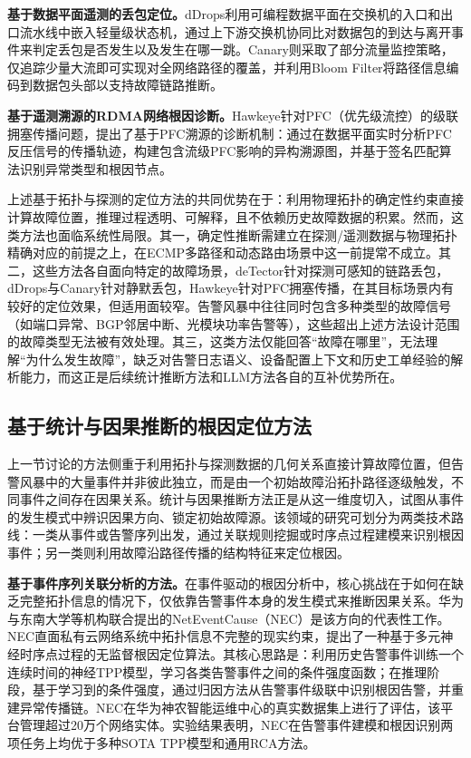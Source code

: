 \textbf{基于数据平面遥测的丢包定位。}dDrops利用可编程数据平面在交换机的入口和出口流水线中嵌入轻量级状态机，通过上下游交换机协同比对数据包的到达与离开事件来判定丢包是否发生以及发生在哪一跳。Canary则采取了部分流量监控策略，仅追踪少量大流即可实现对全网络路径的覆盖，并利用Bloom Filter将路径信息编码到数据包头部以支持故障链路推断。

\textbf{基于遥测溯源的RDMA网络根因诊断。}Hawkeye针对PFC（优先级流控）的级联拥塞传播问题，提出了基于PFC溯源的诊断机制：通过在数据平面实时分析PFC反压信号的传播轨迹，构建包含流级PFC影响的异构溯源图，并基于签名匹配算法识别异常类型和根因节点。

上述基于拓扑与探测的定位方法的共同优势在于：利用物理拓扑的确定性约束直接计算故障位置，推理过程透明、可解释，且不依赖历史故障数据的积累。然而，这类方法也面临系统性局限。其一，确定性推断需建立在探测/遥测数据与物理拓扑精确对应的前提之上，在ECMP多路径和动态路由场景中这一前提常不成立。其二，这些方法各自面向特定的故障场景，deTector针对探测可感知的链路丢包，dDrops与Canary针对静默丢包，Hawkeye针对PFC拥塞传播，在其目标场景内有较好的定位效果，但适用面较窄。告警风暴中往往同时包含多种类型的故障信号（如端口异常、BGP邻居中断、光模块功率告警等），这些超出上述方法设计范围的故障类型无法被有效处理。其三，这类方法仅能回答“故障在哪里”，无法理解“为什么发生故障”，缺乏对告警日志语义、设备配置上下文和历史工单经验的解析能力，而这正是后续统计推断方法和LLM方法各自的互补优势所在。

\subsection{基于统计与因果推断的根因定位方法}

上一节讨论的方法侧重于利用拓扑与探测数据的几何关系直接计算故障位置，但告警风暴中的大量事件并非彼此独立，而是由一个初始故障沿拓扑路径逐级触发，不同事件之间存在因果关系。统计与因果推断方法正是从这一维度切入，试图从事件的发生模式中辨识因果方向、锁定初始故障源。该领域的研究可划分为两类技术路线：一类从事件或告警序列出发，通过关联规则挖掘或时序点过程建模来识别根因事件；另一类则利用故障沿路径传播的结构特征来定位根因。

\textbf{基于事件序列关联分析的方法。}在事件驱动的根因分析中，核心挑战在于如何在缺乏完整拓扑信息的情况下，仅依靠告警事件本身的发生模式来推断因果关系。华为与东南大学等机构联合提出的NetEventCause（NEC）是该方向的代表性工作。NEC直面私有云网络系统中拓扑信息不完整的现实约束，提出了一种基于多元神经时序点过程的无监督根因定位算法。其核心思路是：利用历史告警事件训练一个连续时间的神经TPP模型，学习各类告警事件之间的条件强度函数；在推理阶段，基于学习到的条件强度，通过归因方法从告警事件级联中识别根因告警，并重建异常传播链。NEC在华为神农智能运维中心的真实数据集上进行了评估，该平台管理超过20万个网络实体。实验结果表明，NEC在告警事件建模和根因识别两项任务上均优于多种SOTA TPP模型和通用RCA方法。

